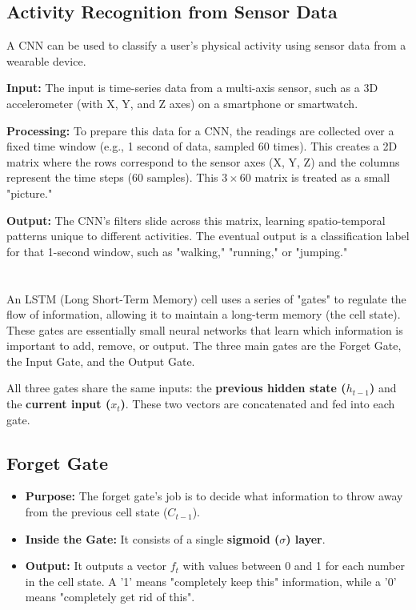 \documentclass[a4paper,12pt]{article}
\begin{document}
\subsection{Activity Recognition from Sensor Data}
A CNN can be used to classify a user's physical activity using sensor data from a wearable device.

\textbf{Input:} The input is time-series data from a multi-axis sensor, such as a 3D accelerometer (with X, Y, and Z axes) on a smartphone or smartwatch.

\textbf{Processing:} To prepare this data for a CNN, the readings are collected over a fixed time window (e.g., 1 second of data, sampled 60 times). This creates a 2D matrix where the rows correspond to the sensor axes (X, Y, Z) and the columns represent the time steps (60 samples). This $3 \times 60$ matrix is treated as a small "picture."

\textbf{Output:} The CNN's filters slide across this matrix, learning spatio-temporal patterns unique to different activities. The eventual output is a classification label for that 1-second window, such as "walking," "running," or "jumping."


\section{}
An LSTM (Long Short-Term Memory) cell uses a series of "gates" to regulate the flow of information, allowing it to maintain a long-term memory (the cell state). These gates are essentially small neural networks that learn which information is important to add, remove, or output. The three main gates are the Forget Gate, the Input Gate, and the Output Gate.

All three gates share the same inputs: the \textbf{previous hidden state ($h_{t-1}$)} and the \textbf{current input ($x_t$)}. These two vectors are concatenated and fed into each gate.

\subsection{Forget Gate}
\begin{itemize}
    \item \textbf{Purpose:} The forget gate's job is to decide what information to throw away from the previous cell state ($C_{t-1}$).
    \item \textbf{Inside the Gate:} It consists of a single \textbf{sigmoid ($\sigma$) layer}.
    \item \textbf{Output:} It outputs a vector $f_t$ with values between 0 and 1 for each number in the cell state. A '1' means "completely keep this" information, while a '0' means "completely get rid of this".
\end{itemize}
\end{document}

